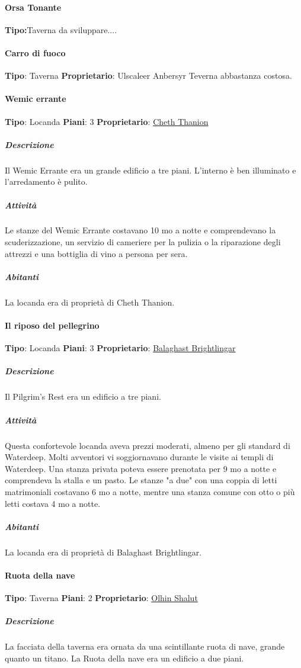 \documentclass{article}
\begin{document}
\paragraph{Orsa Tonante}
\textbf{Tipo:}Taverna
da sviluppare....
\paragraph{Carro di fuoco}
\textbf{Tipo}: Taverna
\textbf{Proprietario}: Ulscaleer Anbersyr
Teverna abbastanza costosa.

\paragraph{Wemic errante}
\textbf{Tipo}: Locanda
\textbf{Piani}: 3
\textbf{Proprietario}: \hyperlink{https://forgottenrealms.fandom.com/wiki/Cheth_Thanion}{Cheth Thanion}
\subparagraph{Descrizione}
Il Wemic Errante era un grande edificio a tre piani. L'interno è ben illuminato e l'arredamento è pulito.
\subparagraph{Attività}
Le stanze del Wemic Errante costavano 10 mo a notte e comprendevano la scuderizzazione, un servizio di cameriere per la pulizia o la riparazione degli attrezzi e una bottiglia di vino a persona per sera.

\subparagraph{Abitanti}
La locanda era di proprietà di Cheth Thanion.
\paragraph{Il riposo del pellegrino}
\textbf{Tipo}: Locanda
\textbf{Piani}: 3
\textbf{Proprietario}: \hyperlink{https://forgottenrealms.fandom.com/wiki/Balaghast_Brightlingar}{Balaghast Brightlingar}

\subparagraph{Descrizione}
Il Pilgrim's Rest era un edificio a tre piani.

\subparagraph{Attività}
Questa confortevole locanda aveva prezzi moderati, almeno per gli standard di Waterdeep. Molti avventori vi soggiornavano durante le visite ai templi di Waterdeep. Una stanza privata poteva essere prenotata per 9  mo a notte e comprendeva la stalla e un pasto. Le stanze "a due" con una coppia di letti matrimoniali costavano 6  mo a notte, mentre una stanza comune con otto o più letti costava 4  mo a notte.

\subparagraph{Abitanti}
La locanda era di proprietà di Balaghast Brightlingar.
\paragraph{Ruota della nave}
\textbf{Tipo}: Taverna
\textbf{Piani}: 2
\textbf{Proprietario}: \hyperlink{https://forgottenrealms.fandom.com/wiki/Olhin_Shalut}{Olhin Shalut}
\subparagraph{Descrizione}
La facciata della taverna era ornata da una scintillante ruota di nave, grande quanto un titano. La Ruota della nave era un edificio a due piani.
\end{document}
